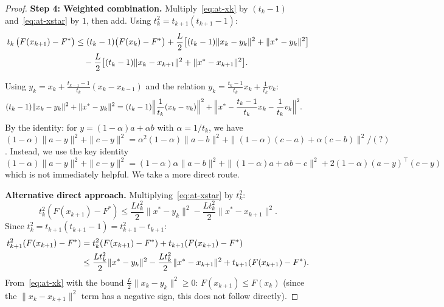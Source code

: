 \documentclass[11pt,a4paper]{article}
\begin{document}
\begin{proof}
\textbf{Step 4: Weighted combination.}
Multiply~\eqref{eq:at-xk} by $(t_k - 1)$ and~\eqref{eq:at-xstar}
by $1$, then add. Using $t_k^2 = t_{k+1}(t_{k+1} - 1)$:
\begin{align}
  t_k\,\bigl(F(x_{k+1}) - F^*\bigr)
  &\le (t_k - 1)\bigl(F(x_k) - F^*\bigr)
  + \frac{L}{2}\bigl[(t_k-1)\|x_k - y_k\|^2 + \|x^* - y_k\|^2\bigr]
  \notag \\
  &\quad - \frac{L}{2}\bigl[(t_k-1)\|x_k - x_{k+1}\|^2
    + \|x^* - x_{k+1}\|^2\bigr]. \label{eq:fista-weighted}
\end{align}

Using $y_k = x_k + \frac{t_{k-1}-1}{t_k}(x_k - x_{k-1})$ and the
relation $y_k = \frac{t_k-1}{t_k}x_k + \frac{1}{t_k}v_k$:
\begin{align*}
  (t_k-1)\|x_k - y_k\|^2 + \|x^* - y_k\|^2
  &= (t_k - 1)\Bigl\|\frac{1}{t_k}(x_k - v_k)\Bigr\|^2
    + \Bigl\|x^* - \frac{t_k-1}{t_k}x_k - \frac{1}{t_k}v_k\Bigr\|^2.
\end{align*}
By the identity: for $y = (1-\alpha)a + \alpha b$ with
$\alpha = 1/t_k$, we have
$(1-\alpha)\|a - y\|^2 + \|c - y\|^2
= \alpha^2(1-\alpha)\|a-b\|^2 + \|(1-\alpha)(c-a) + \alpha(c-b)\|^2
/(?)$. Instead, we use the key identity
\begin{equation}\label{eq:key-identity}
  (1-\alpha)\|a - y\|^2 + \|c - y\|^2
  = (1-\alpha)\alpha\|a - b\|^2 + \|(1-\alpha)a + \alpha b - c\|^2
  + 2(1-\alpha)(a - y)^\top(c - y)
\end{equation}
which is not immediately helpful. We take a more direct route.

\textbf{Alternative direct approach.}
Multiplying~\eqref{eq:at-xstar} by $t_k^2$:
\begin{equation}\label{eq:at-xstar-scaled}
  t_k^2(F(x_{k+1}) - F^*) \le \frac{Lt_k^2}{2}\|x^* - y_k\|^2
  - \frac{Lt_k^2}{2}\|x^* - x_{k+1}\|^2.
\end{equation}
Since $t_k^2 = t_{k+1}(t_{k+1}-1) = t_{k+1}^2 - t_{k+1}$:
\begin{align}
  t_{k+1}^2(F(x_{k+1}) - F^*)
  &= t_k^2(F(x_{k+1}) - F^*) + t_{k+1}(F(x_{k+1}) - F^*) \notag \\
  &\le \frac{Lt_k^2}{2}\|x^* - y_k\|^2
  - \frac{Lt_k^2}{2}\|x^* - x_{k+1}\|^2
  + t_{k+1}(F(x_{k+1}) - F^*). \label{eq:expand-t}
\end{align}
From~\eqref{eq:at-xk} with the bound
$\frac{L}{2}\|x_k - y_k\|^2 \ge 0$:
$F(x_{k+1}) \le F(x_k)$ (since the $\|x_k - x_{k+1}\|^2$ term
has a negative sign, this does not follow directly).


\end{proof}
\end{document}
